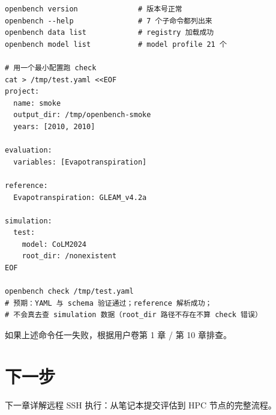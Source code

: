 \begin{verbatim}
openbench version              # 版本号正常
openbench --help               # 7 个子命令都列出来
openbench data list            # registry 加载成功
openbench model list           # model profile 21 个

# 用一个最小配置跑 check
cat > /tmp/test.yaml <<EOF
project:
  name: smoke
  output_dir: /tmp/openbench-smoke
  years: [2010, 2010]

evaluation:
  variables: [Evapotranspiration]

reference:
  Evapotranspiration: GLEAM_v4.2a

simulation:
  test:
    model: CoLM2024
    root_dir: /nonexistent
EOF

openbench check /tmp/test.yaml
# 预期：YAML 与 schema 验证通过；reference 解析成功；
# 不会真去查 simulation 数据（root_dir 路径不存在不算 check 错误）
\end{verbatim}

如果上述命令任一失败，根据用户卷第 1 章 / 第 10 章排查。

\section{下一步}

下一章详解远程 SSH 执行：从笔记本提交评估到 HPC 节点的完整流程。
